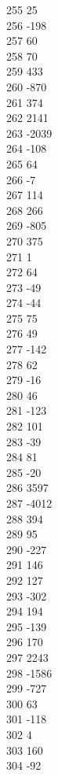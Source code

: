 { 255	25 \\
 256	-198 \\
 257	60 \\
 258	70 \\
 259	433 \\
 260	-870 \\
 261	374 \\
 262	2141 \\
 263	-2039 \\
 264	-108 \\
 265	64 \\
 266	-7 \\
 267	114 \\
 268	266 \\
 269	-805 \\
 270	375 \\
 271	1 \\
 272	64 \\
 273	-49 \\
 274	-44 \\
 275	75 \\
 276	49 \\
 277	-142 \\
 278	62 \\
 279	-16 \\
 280	46 \\
 281	-123 \\
 282	101 \\
 283	-39 \\
 284	81 \\
 285	-20 \\
 286	3597 \\
 287	-4012 \\
 288	394 \\
 289	95 \\
 290	-227 \\
 291	146 \\
 292	127 \\
 293	-302 \\
 294	194 \\
 295	-139 \\
 296	170 \\
 297	2243 \\
 298	-1586 \\
 299	-727 \\
 300	63 \\
 301	-118 \\
 302	4 \\
 303	160 \\
 304	-92 \\
}
